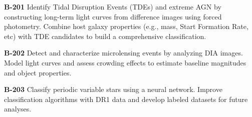\textbf{B-201} Identify Tidal Disruption Events (TDEs) and extreme AGN by constructing long-term light curves from difference images using forced photometry.
Combine host galaxy properties (e.g., mass, Start Formation Rate, etc) with TDE candidates to build a comprehensive classification.

\textbf{B-202} Detect and characterize microlensing events by analyzing DIA images.
Model light curves and assess crowding effects to estimate baseline magnitudes and object properties.

\textbf{B-203} Classify periodic variable stars using a neural network.
Improve classification algorithms with DR1 data and develop labeled datasets for future analyses.
